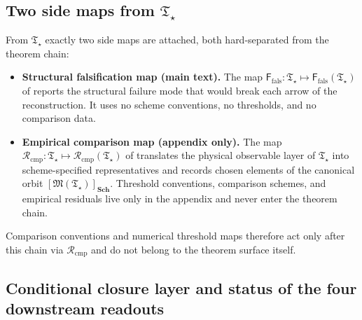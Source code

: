 \documentclass[11pt,a4paper]{article}
\theoremstyle{definition}
\theoremstyle{remark}
\newcommand{\Tstar}{\mathfrak T_{\star}}
\newcommand{\Ffals}{\mathsf F_{\mathrm{fals}}}
\newcommand{\Rcmp}{\mathcal R_{\mathrm{cmp}}}
\newcommand{\SchGrp}{\mathbf{Sch}}
\newcommand{\Mop}{\mathfrak M}
\begin{document}
\subsection{Two side maps from \texorpdfstring{$\Tstar$}{T-star}}

From $\Tstar$ exactly two side maps are attached, both hard-separated from the theorem chain:
\begin{itemize}[leftmargin=1.5em, topsep=3pt, itemsep=2pt]
    \item \textbf{Structural falsification map (main text).} The map
    $\Ffals:\Tstar\mapsto\Ffals(\Tstar)$ of  reports the
    structural failure mode that would break each arrow of the reconstruction. It uses no
    scheme conventions, no thresholds, and no comparison data.
    \item \textbf{Empirical comparison map (appendix only).} The map
    $\Rcmp:\Tstar\mapsto\Rcmp(\Tstar)$ of  translates the
    physical observable layer of $\Tstar$ into scheme-specified representatives and records chosen
    elements of the canonical orbit $[\Mop(\Tstar)]_{\SchGrp}$. Threshold conventions, comparison
    schemes, and empirical residuals live only in the appendix and never enter the theorem chain.
\end{itemize}
Comparison conventions and numerical threshold maps therefore act only after this chain via
$\Rcmp$ and do not belong to the theorem surface itself.

\subsection{Conditional closure layer and status of the four downstream readouts}
\label{subsec:conditional-closure-status}
\end{document}
